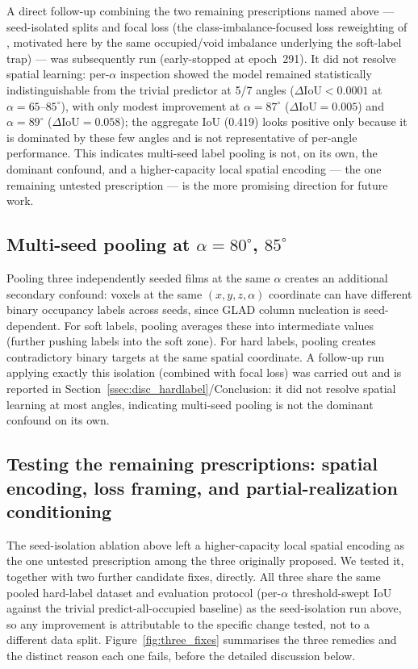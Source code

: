 \documentclass[aip,amsmath,amssymb,reprint]{revtex4-1}
\renewcommand{\ang}{\ensuremath{\alpha}} %
\newcommand{\iou}{\ensuremath{\mathrm{IoU}}}
\begin{document}
A direct follow-up combining the two remaining prescriptions named
above — seed-isolated splits and focal loss (the class-imbalance-focused
loss reweighting of \citet{lin2017focal}, motivated here by the same
occupied/void imbalance underlying the soft-label trap) — was
subsequently run (early-stopped at epoch~291). It did not resolve spatial learning:
per-$\alpha$ inspection showed the model remained statistically
indistinguishable from the trivial predictor at 5/7 angles
($\Delta\iou < 0.0001$ at $\ang = 65$--$85^{\circ}$), with only modest
improvement at $\ang = 87^{\circ}$ ($\Delta\iou = 0.005$) and
$\ang = 89^{\circ}$ ($\Delta\iou = 0.058$); the aggregate IoU (0.419) looks
positive only because it is dominated by these few angles and is
not representative of per-angle performance. This indicates
multi-seed label pooling is not, on its own, the dominant
confound, and a higher-capacity local spatial encoding — the one remaining untested
prescription — is the more promising direction for future work.

\subsection{Multi-seed pooling at $\ang = 80^{\circ}$, $85^{\circ}$}
\label{ssec:disc_multiseed}

Pooling three independently seeded films at the same $\ang$
creates an additional secondary confound: voxels at the same
$(x,y,z,\ang)$ coordinate can have different binary occupancy
labels across seeds, since GLAD column nucleation is
seed-dependent.
For soft labels, pooling averages these into intermediate values
(further pushing labels into the soft zone).
For hard labels, pooling creates contradictory binary targets
at the same spatial coordinate.
A follow-up run applying exactly this isolation (combined with
focal loss) was carried out and is reported in
Section~\ref{ssec:disc_hardlabel}/Conclusion: it did not resolve
spatial learning at most angles, indicating multi-seed pooling is
not the dominant confound on its own.

\subsection{Testing the remaining prescriptions: spatial encoding, loss framing, and partial-realization conditioning}
\label{ssec:disc_tier2}

The seed-isolation ablation above left a higher-capacity local spatial encoding as the one
untested prescription among the three originally proposed. We tested it,
together with two further candidate fixes, directly. All three share the same
pooled hard-label dataset and evaluation protocol (per-$\ang$ threshold-swept
IoU against the trivial predict-all-occupied baseline) as the seed-isolation
run above, so any improvement is attributable to the specific change tested,
not to a different data split.
Figure~\ref{fig:three_fixes} summarises the three remedies and the
distinct reason each one fails, before the detailed discussion below.
\end{document}
